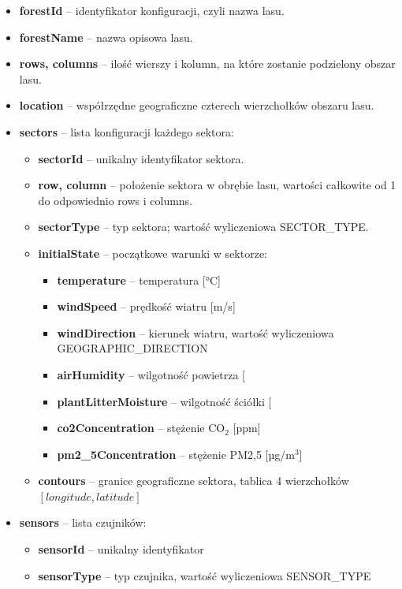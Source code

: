 \begin{itemize}
    \item \textbf{forestId} – identyfikator konfiguracji, czyli nazwa lasu.
    \item \textbf{forestName} – nazwa opisowa lasu.
    \item \textbf{rows, columns} – ilość wierszy i kolumn, na które zostanie podzielony obszar lasu.
    \item \textbf{location} – współrzędne geograficzne czterech wierzchołków obszaru lasu.
    \item \textbf{sectors} – lista konfiguracji każdego sektora:
    \begin{itemize}
        \item \textbf{sectorId} – unikalny identyfikator sektora.
        \item \textbf{row, column} – położenie sektora w obrębie lasu, wartości całkowite od 1 do odpowiednio rows i columns.
        \item \textbf{sectorType} – typ sektora; wartość wyliczeniowa SECTOR\_TYPE.
        \item \textbf{initialState} – początkowe warunki w sektorze:
        \begin{itemize}
            \item \textbf{temperature} – temperatura [°C]
            \item \textbf{windSpeed} – prędkość wiatru [m/s]
            \item \textbf{windDirection} – kierunek wiatru, wartość wyliczeniowa GEOGRAPHIC\_DIRECTION
            \item \textbf{airHumidity} – wilgotność powietrza [%
            \item \textbf{plantLitterMoisture} – wilgotność ściółki [%
            \item \textbf{co2Concentration} – stężenie CO\(_2\) [ppm]
            \item \textbf{pm2\_5Concentration} – stężenie PM2,5 [µg/m\(^3\)]
        \end{itemize}
        \item \textbf{contours} – granice geograficzne sektora, tablica 4 wierzchołków \([longitude, latitude]\)
    \end{itemize}
    \item \textbf{sensors} – lista czujników:
    \begin{itemize}
        \item \textbf{sensorId} – unikalny identyfikator
        \item \textbf{sensorType} – typ czujnika, wartość wyliczeniowa SENSOR\_TYPE

\end{itemize}
\end{itemize}

